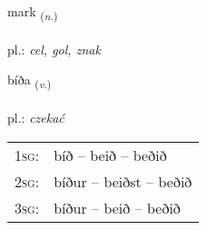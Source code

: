 \documentclass[frontgrid, backgrid]{flacards}\usepackage[]{graphicx}\usepackage[]{xcolor}
\begin{document}
\renewcommand{\flhead}{\vskip5pt \fboxsep=0pt {\small\bfseries\footnotesize Nafnorð | rzeczownik}}
\renewcommand{\fcfoot}{\vskip5pt \fboxsep=0pt \hspace{2pt}{\small\bfseries\footnotesize 1K}}

\renewcommand{\blhead}{\vskip5pt {\small\bfseries\footnotesize Nafnorð | rzeczownik }}
\renewcommand{\bcfoot}{\vskip5pt \hspace{2pt}{\small\bfseries\footnotesize 1K}}


{mark \small{\textsubscript{(\textit{n.})}} \\[1ex] %
\textphonetic{[mar̥k]} \\
pl.: \emph{cel, gol, znak} \\  [2ex]
\renewcommand*{\arraystretch}{0.8}
}

\renewcommand{\flhead}{\vskip5pt \fboxsep=0pt {\small\bfseries\footnotesize Sagnorð | czasownik}}
\renewcommand{\fcfoot}{\vskip5pt \fboxsep=0pt \hspace{2pt}{\small\bfseries\footnotesize 1K}}

\renewcommand{\blhead}{\vskip5pt {\small\bfseries\footnotesize Sagnorð | czasownik }}
\renewcommand{\bcfoot}{\vskip5pt \hspace{2pt}{\small\bfseries\footnotesize 1K}}


{bíða \small{\textsubscript{(\textit{v.})}} \\[1ex] %
\textphonetic{[piːða]} \\
pl.: \emph{czekać} \\  [2ex]
\renewcommand*{\arraystretch}{0.8}
\begin{tabular}{p{1cm}l}
\textsc{1sg}: & bíð -- beið -- beðið \\ 
\textsc{2sg}: & bíður -- beiðst -- beðið \\ 
\textsc{3sg}: & bíður -- beið -- beðið \\ 
\end{tabular}
}
\end{document}
